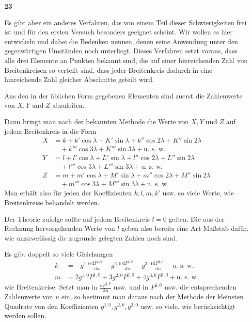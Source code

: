 {\renewcommand{\Article}[1]{\par\medskip\Needspace{4\baselineskip}\pdfbookmark[1]{Art. #1}{erdmagnetismus-art-#1}\centerline{\textbf{#1}}\nobreak\smallskip}\Article{23}}
Es gibt aber ein anderes Verfahren, das von einem Teil dieser Schwierigkeiten frei ist und für den ersten Versuch besonders geeignet scheint. Wir wollen es hier entwickeln und dabei die Bedenken nennen, denen seine Anwendung unter den gegenwärtigen Umständen noch unterliegt. Dieses Verfahren setzt voraus, dass alle drei Elemente an Punkten bekannt sind, die auf einer hinreichenden Zahl von Breitenkreisen so verteilt sind, dass jeder Breitenkreis dadurch in eine hinreichende Zahl gleicher Abschnitte geteilt wird.

Aus den in der üblichen Form gegebenen Elementen sind zuerst die Zahlenwerte von $X,Y$ und $Z$ abzuleiten.

Dann bringt man nach der bekannten Methode die Werte von $X,Y$ und $Z$ auf jedem Breitenkreis in die Form
\[
\begin{aligned}
X&=k+k'\cos\lambda+K'\sin\lambda+k''\cos2\lambda+K''\sin2\lambda\\&\quad+k'''\cos3\lambda+K'''\sin3\lambda+\text{u. s. w.}\\
Y&=l+l'\cos\lambda+L'\sin\lambda+l''\cos2\lambda+L''\sin2\lambda\\&\quad+l'''\cos3\lambda+L'''\sin3\lambda+\text{u. s. w.}\\
Z&=m+m'\cos\lambda+M'\sin\lambda+m''\cos2\lambda+M''\sin2\lambda\\&\quad+m'''\cos3\lambda+M'''\sin3\lambda+\text{u. s. w.}
\end{aligned}
\]
Man erhält also für jeden der Koeffizienten $k,l,m,k'$ usw. so viele Werte, wie Breitenkreise behandelt werden.

Der Theorie zufolge sollte auf jedem Breitenkreis $l=0$ gelten. Die aus der Rechnung hervorgehenden Werte von $l$ geben also bereits eine Art Maßstab dafür, wie unzuverlässig die zugrunde gelegten Zahlen noch sind.

Es gibt doppelt so viele Gleichungen
\[
\begin{aligned}
k&=-g^{1,0}\frac{\mathrm{d}P^{1,0}}{\mathrm{d}u}-g^{2,0}\frac{\mathrm{d}P^{2,0}}{\mathrm{d}u}-g^{3,0}\frac{\mathrm{d}P^{3,0}}{\mathrm{d}u}-\text{u. s. w.}\\
m&=2g^{1,0}P^{1,0}+3g^{2,0}P^{2,0}+4g^{3,0}P^{3,0}+\text{u. s. w.}
\end{aligned}
\]
wie Breitenkreise. Setzt man in $\frac{\mathrm{d}P^{1,0}}{\mathrm{d}u}$ usw. und in $P^{1,0}$ usw. die entsprechenden Zahlenwerte von $u$ ein, so bestimmt man daraus nach der Methode der kleinsten Quadrate von den Koeffizienten $g^{1,0},g^{2,0},g^{3,0}$ usw. so viele, wie berücksichtigt werden sollen.

